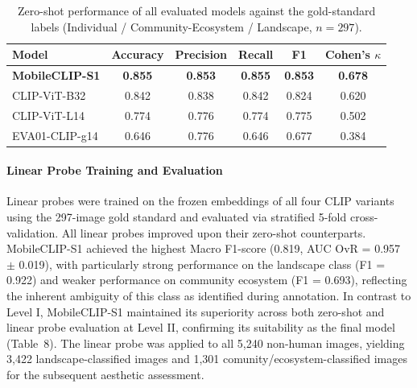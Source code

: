 \documentclass[hidelinks, 11pt]{article}
\begin{document}
\begin{table}[htbp]
\centering
\caption{Zero-shot performance of all evaluated models against the gold-standard labels (Individual / Community-Ecosystem / Landscape, $n=297$).}
\label{tab:gold_standard_validation_indcoecoland}
\begin{tabular}{@{}lccccc@{}}
\toprule
\textbf{Model} & \textbf{Accuracy} & \textbf{Precision} & \textbf{Recall} & \textbf{F1} & \textbf{Cohen's $\kappa$} \\
\midrule
\textbf{MobileCLIP-S1}    & \textbf{0.855} & \textbf{0.853} & \textbf{0.855} & \textbf{0.853} & \textbf{0.678} \\
CLIP-ViT-B32               & 0.842 & 0.838 & 0.842 & 0.824 & 0.620 \\
CLIP-ViT-L14                & 0.774 & 0.776 & 0.774 & 0.775 & 0.502 \\
EVA01-CLIP-g14              & 0.646 & 0.776 & 0.646 & 0.677 & 0.384 \\
\bottomrule
\end{tabular}
\end{table}

\paragraph{Linear Probe Training and Evaluation}
Linear probes were trained on the frozen embeddings of all four CLIP variants using the 297-image gold standard and evaluated via stratified 5-fold cross-validation. All linear probes improved upon their zero-shot counterparts. MobileCLIP-S1 achieved the highest Macro F1-score (0.819, AUC OvR = 0.957 $\pm$ 0.019), with particularly strong performance on the landscape class (F1 = 0.922) and weaker performance on community ecosystem (F1 = 0.693), reflecting the inherent ambiguity of this class as identified during annotation. In contrast to Level I, MobileCLIP-S1 maintained its superiority across both zero-shot and linear probe evaluation at Level II, confirming its suitability as the final model (Table~8). The linear probe was applied to all 5,240 non-human images, yielding 3,422 landscape-classified images and 1,301 comunity/ecosystem-classified images for the subsequent aesthetic assessment.
\end{document}
